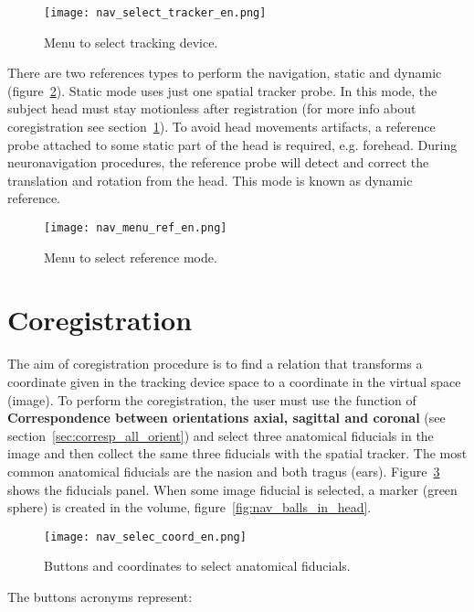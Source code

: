 \begin{figure}[!htb]
\centering
\texttt{[image: nav\_select\_tracker\_en.png]}
\caption{Menu to select tracking device.}
\label{fig:nav_select_tracker}
\end{figure}

There are two references types to perform the navigation, static and dynamic (figure~\ref{fig:nav_menu_ref}).
Static mode uses just one spatial tracker probe. In this mode, the subject head must stay motionless after
registration (for more info about coregistration see section~\ref{sec:corregistro}). To avoid head movements artifacts,
a reference probe attached to some static part of the head is required, e.g. forehead. During neuronavigation
procedures, the reference probe will detect and correct the translation and rotation from the head.
This mode is known as dynamic reference.

\begin{figure}[!htb]
\centering
\texttt{[image: nav\_menu\_ref\_en.png]}
\caption{Menu to select reference mode.}
\label{fig:nav_menu_ref}
\end{figure}

\section{Coregistration}
\label{sec:corregistro}

The aim of coregistration procedure is to find a relation that transforms a coordinate given in the tracking device space
to a coordinate in the virtual space (image). To perform the coregistration, the user must
use the function of \textbf{Correspondence between orientations axial, sagittal and coronal} (see section~\ref{sec:corresp_all_orient})
and select three anatomical fiducials in the image and then collect the same three fiducials with the spatial tracker.
The most common anatomical fiducials are the nasion and both tragus (ears). Figure~\ref{fig:nav_selec_coord} shows the fiducials panel.
When some image fiducial is selected, a marker (green sphere) is created in the volume, figure~\ref{fig:nav_balls_in_head}.

\begin{figure}[!htb]
\centering
\texttt{[image: nav\_selec\_coord\_en.png]}
\caption{Buttons and coordinates to select anatomical fiducials.}
\label{fig:nav_selec_coord}
\end{figure}

The buttons acronyms represent:

